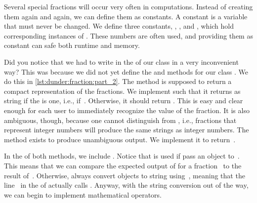 Several special fractions will occur very often in computations.
Instead of creating them again and again, we can define them as constants.
A constant is a variable that must never be changed.%
%
%
%
%
%
We define three constants, , , and , which hold corresponding instances of .
These numbers are often used, and providing them as constant can safe both runtime and memory.

%
\afterpage{\clearpage}

Did you notice that we had to write  in the  of our class in a very inconvenient way?
This was because we did not yet define the  and  methods for our class .
We do this in \cref{lst:dunder:fraction:part_2}.
The method  is supposed to return a compact representation of the fractions.
We implement such that it returns  as string if the  is one, i.e., if~.
Otherwise, it should return .
This is easy and clear enough for each user to immediately recognize the value of the fraction.
It is also ambiguous, though, because one cannot distinguish  from , i.e., fractions that represent integer numbers will produce the same strings as integer numbers.
The  method exists to produce unambiguous output.
We implement it to return~.

In the  of both methods, we include .
Notice that  is used if pass an object to~.
This means that we can compare the expected output of  for a fraction~ to the result of~.
Otherwise,  always convert objects to string using~, meaning that the line~ in the  of  actually calls .
Anyway, with the string conversion out of the way, we can begin to implement mathematical operators.

